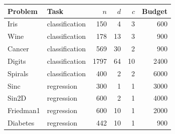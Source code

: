 \begin{tabular}{@{}llrrrr@{}}
\toprule
Problem & Task & $n$ & $d$ & $c$ & Budget \\
\midrule
Iris & classification & 150 & 4 & 3 & 600 \\
Wine & classification & 178 & 13 & 3 & 900 \\
Cancer & classification & 569 & 30 & 2 & 900 \\
Digits & classification & 1797 & 64 & 10 & 2400 \\
Spirals & classification & 400 & 2 & 2 & 6000 \\
Sinc & regression & 300 & 1 & 1 & 3000 \\
Sin2D & regression & 600 & 2 & 1 & 4000 \\
Friedman1 & regression & 600 & 10 & 1 & 2000 \\
Diabetes & regression & 442 & 10 & 1 & 900 \\
\bottomrule
\end{tabular}
